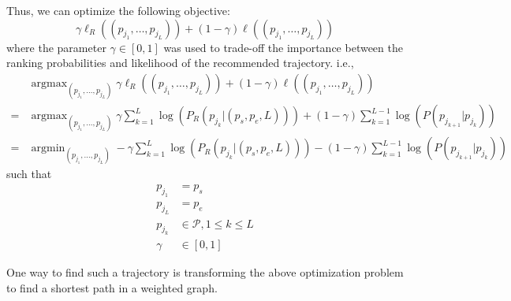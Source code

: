 \documentclass{sig-alternate-05-2015}
\DeclareMathOperator*{\argmin}{argmin}
\DeclareMathOperator*{\argmax}{argmax}
\begin{document}


Thus, we can optimize the following objective:
\begin{displaymath}
    \gamma \ell_R((p_{j_1}, \dots, p_{j_L})) + (1 - \gamma) \ell((p_{j_1}, \dots, p_{j_L}))
\end{displaymath}
where the parameter $\gamma \in [0, 1]$ was used to trade-off the importance between the ranking probabilities 
and likelihood of the recommended trajectory.
i.e.,
\begin{align*}
    & \argmax_{(p_{j_1}, \dots, p_{j_L})} \gamma \ell_R((p_{j_1}, \dots, p_{j_L})) + (1 - \gamma) \ell((p_{j_1}, \dots, p_{j_L})) \\
   =& \argmax_{(p_{j_1}, \dots, p_{j_L})} \gamma \sum_{k=1}^L \log \left( P_R(p_{j_k} |(p_s, p_e, L)) \right) + 
    (1 - \gamma) \sum_{k=1}^{L-1} \log \left( P(p_{j_{k+1}} | p_{j_k}) \right) \\
   =& \argmin_{(p_{j_1}, \dots, p_{j_L})} - \gamma \sum_{k=1}^L \log \left( P_R(p_{j_k} |(p_s, p_e, L)) \right) -
    (1 - \gamma) \sum_{k=1}^{L-1} \log \left( P(p_{j_{k+1}} | p_{j_k}) \right) 
\end{align*}
such that
\begin{align*}
    p_{j_1} &= p_s \\
    p_{j_L} &= p_e \\
    p_{j_k} &\in \mathcal{P}, 1 \le k \le L \\
    \gamma  &\in [0, 1]
\end{align*}

One way to find such a trajectory is transforming the above optimization problem to 
find a shortest path in a weighted graph.
\end{document}
